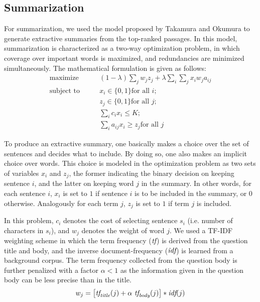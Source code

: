 \documentclass[a4paper,10pt,conference,compsocconf,final]{IEEEtran}
\newcommand{\var}[1]{\mbox{\emph{#1}}}
\begin{document}
{{{{\subsection{Summarization}
\label{sec:sum}

For summarization, we used the model proposed by Takamura and Okumura
\cite{takamura2009text} to generate extractive summaries from the
top-ranked passages.
In this model, summarization is characterized as a two-way
optimization problem, in which coverage over important words is
maximized, and redundancies are minimized simultaneously.
The mathematical formulation is given as follows:
\begin{equation}
\begin{split}
  \textrm{maximize} \qquad & (1-\lambda) \sum_{j} w_j z_j + \lambda \sum_{i}\sum_{j} x_i w_j a_{ij} \\
  \textrm{subject to} \qquad 
       & x_i \in \{0,1\} \textrm{for all $i$}; \\ 
       & z_j \in \{0,1\} \textrm{for all $j$}; \\
       & \sum_{i} c_ix_i \le K; \\
       & \sum_{i}^{} a_{ij}x_i \ge z_j \textrm{for all $j$} 
\end{split}
\end{equation}

To produce an extractive summary, one basically makes a choice over
the set of sentences and decides what to include.
By doing so, one also makes an implicit choice over words.
This choice is modeled in the optimization problem as two sets of
variables $x_i$ and $z_j$, the former indicating the binary decision
on keeping sentence $i$, and the latter on keeping word $j$ in
the summary.
In other words, for each sentence $i$, $x_i$ is set to $1$ if sentence
$i$ is to be included in the summary, or $0$ otherwise.
Analogously for each term $j$, $z_j$ is set to $1$ if term $j$ is
included.

In this problem, $c_i$ denotes the cost of selecting sentence $s_i$ (i.e.
number of characters in $s_i$), and $w_j$ denotes the weight of word $j$.
We used a TF-IDF weighting scheme in which the term frequency ($\var{tf}$) is
derived from the question title and body, and the inverse document-frequency
($\var{idf}$) is learned from a background corpus.
The term frequency collected from the question body is further penalized with
a factor $\alpha < 1$ as the information given in the question body can
be less precise than in the title.
\begin{equation}
  w_j = \left[ \var{tf}_{\var{title}}(j) + \alpha ~ \var{tf}_{\var{body}}(j) \right] * \var{idf}(j)
\end{equation}

}}}}
\end{document}
